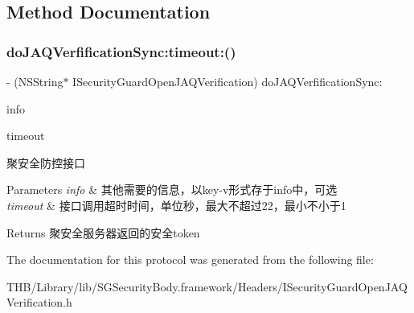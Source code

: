 \subsection{Method Documentation}
\mbox{\label{protocol_i_security_guard_open_j_a_q_verification_01-p_a6b2631dc13624e88d53af589d28647d5}} 
\subsubsection{\texorpdfstring{do\+J\+A\+Q\+Verfification\+Sync\+:timeout\+:()}{doJAQVerfificationSync:timeout:()}}
{\footnotesize\ttfamily -\/ (N\+S\+String$\ast$ I\+Security\+Guard\+Open\+J\+A\+Q\+Verification) do\+J\+A\+Q\+Verfification\+Sync\+: \begin{DoxyParamCaption}\item[{(N\+S\+Dictionary $\ast$)}]{info }\item[{timeout:(N\+S\+Integer)}]{timeout }\end{DoxyParamCaption}}

聚安全防控接口


\begin{DoxyParams}{Parameters}
{\em info} & 其他需要的信息，以key-\/v形式存于info中，可选 \\
\hline
{\em timeout} & 接口调用超时时间，单位秒，最大不超过22，最小不小于1\\
\hline
\end{DoxyParams}
\begin{DoxyReturn}{Returns}
聚安全服务器返回的安全token 
\end{DoxyReturn}


The documentation for this protocol was generated from the following file\+:\begin{DoxyCompactItemize}
\item 
T\+H\+B/\+Library/lib/\+S\+G\+Security\+Body.\+framework/\+Headers/I\+Security\+Guard\+Open\+J\+A\+Q\+Verification.\+h\end{DoxyCompactItemize}
